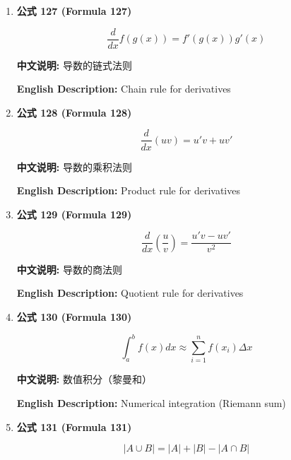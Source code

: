 \documentclass[12pt,a4paper]{article}
\begin{document}
\begin{enumerate}[leftmargin=*]
\item \textbf{公式 127 (Formula 127)}

\begin{equation}
\frac{d}{dx}f(g(x)) = f'(g(x))g'(x)
\end{equation}

\textbf{中文说明:} 导数的链式法则

\textbf{English Description:} Chain rule for derivatives

\vspace{0.5cm}

\item \textbf{公式 128 (Formula 128)}

\begin{equation}
\frac{d}{dx}(uv) = u'v + uv'
\end{equation}

\textbf{中文说明:} 导数的乘积法则

\textbf{English Description:} Product rule for derivatives

\vspace{0.5cm}

\item \textbf{公式 129 (Formula 129)}

\begin{equation}
\frac{d}{dx}\left(\frac{u}{v}\right) = \frac{u'v - uv'}{v^2}
\end{equation}

\textbf{中文说明:} 导数的商法则

\textbf{English Description:} Quotient rule for derivatives

\vspace{0.5cm}

\item \textbf{公式 130 (Formula 130)}

\begin{equation}
\int_{a}^{b} f(x) dx \approx \sum_{i=1}^{n} f(x_i) \Delta x
\end{equation}

\textbf{中文说明:} 数值积分（黎曼和）

\textbf{English Description:} Numerical integration (Riemann sum)

\vspace{0.5cm}

\item \textbf{公式 131 (Formula 131)}

\begin{equation}
|A \cup B| = |A| + |B| - |A \cap B|
\end{equation}


\end{enumerate}
\end{document}

